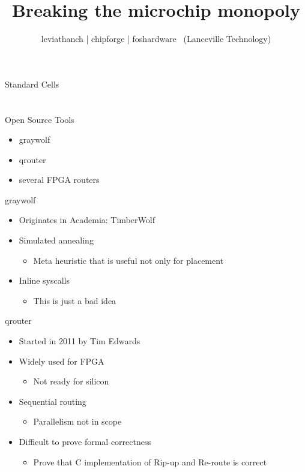 \documentclass[9pt]{beamer}
\author{leviathanch | chipforge | foshardware \ (Lanceville Technology)}
\title{Breaking the microchip monopoly}
\begin{document}

\section[Standard Cells]{}
\begin{frame}{Standard Cells}
\end{frame}

\section[Place'n'Route]{}
\begin{frame}{Open Source Tools}
	\begin{itemize}
        \setlength\itemsep{1em}
		\item graywolf
		\item qrouter
		\item several FPGA routers
	\end{itemize}
\end{frame}

\begin{frame}{graywolf}
	\begin{itemize}
        \setlength\itemsep{1em}
		\item Originates in Academia: TimberWolf
		\item Simulated annealing
	        \begin{itemize}
		    \item Meta heuristic that is useful not only for placement
	        \end{itemize}
		\item Inline syscalls
	        \begin{itemize}
		    \item This is just a bad idea
	        \end{itemize}
	\end{itemize}
\end{frame}

\begin{frame}{qrouter}
	\begin{itemize}
        \setlength\itemsep{1em}
		\item Started in 2011 by Tim Edwards 
		\item Widely used for FPGA
	        \begin{itemize}
		    \item Not ready for silicon
	        \end{itemize}
		\item Sequential routing
	        \begin{itemize}
		    \item Parallelism not in scope
	        \end{itemize}
		\item Difficult to prove formal correctness
	        \begin{itemize}
		    \item Prove that C implementation of Rip-up and Re-route is correct
	        \end{itemize}
	\end{itemize}
\end{frame}
\end{document}
